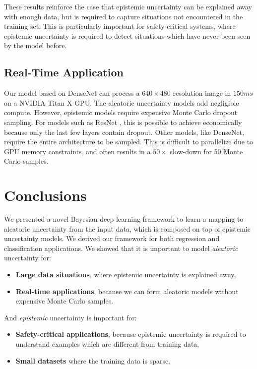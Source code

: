\documentclass{article}
\begin{document}
These results reinforce the case that epistemic uncertainty can be explained away with enough data, but is required to capture situations not encountered in the training set. This is particularly important for safety-critical systems, where epistemic uncertainty is required to detect situations which have never been seen by the model before.







\subsection{Real-Time Application}

Our model based on DenseNet \cite{jegou2016one} can process a $640\times480$ resolution image in $150ms$ on a NVIDIA Titan X GPU. The aleatoric uncertainty models add negligible compute. However, epistemic models require expensive Monte Carlo dropout sampling. For models such as ResNet \cite{he2004multiscale}, this is possible to achieve economically because only the last few layers contain dropout. Other models, like DenseNet, require the entire architecture to be sampled. This is difficult to parallelize due to GPU memory constraints, and often results in a $50\times$ slow-down for 50 Monte Carlo samples.

\section{Conclusions}

We presented a novel Bayesian deep learning framework to learn a mapping to aleatoric uncertainty from the input data, which is composed on top of epistemic uncertainty models. We derived our framework for both regression and classification applications. We showed that it is important to model \textit{aleatoric} uncertainty for:
\begin{itemize}[topsep=0pt,itemsep=-1ex,partopsep=1ex,parsep=1ex]
\item \textbf{Large data situations}, where epistemic uncertainty is explained away,
\item \textbf{Real-time applications}, because we can form aleatoric models without expensive Monte Carlo samples.
\end{itemize}
And \textit{epistemic} uncertainty is important for:
\begin{itemize}[topsep=0pt,itemsep=-1ex,partopsep=1ex,parsep=1ex]
\item \textbf{Safety-critical applications}, because epistemic uncertainty is required to understand examples which are different from training data,
\item \textbf{Small datasets} where the training data is sparse.
\end{itemize}
\end{document}
